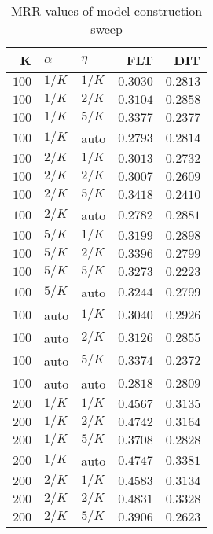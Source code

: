 
\begin{table}
\begin{spacing}{1.2}
\centering
\caption{MRR values of \tika model construction sweep}
\label{table:tika_model_sweep}
\vspace{0.2em}
\parbox{.45\linewidth}{\centering \begin{tabular}{rll|rr}
\toprule
    K &  $\alpha$ &    $\eta$ &           FLT &      DIT \\
\midrule
$100$ &  $1/K$ &  $1/K$ &      $0.3030$ & $0.2813$ \\
$100$ &  $1/K$ &  $2/K$ &      $0.3104$ & $0.2858$ \\
$100$ &  $1/K$ &  $5/K$ &      $0.3377$ & $0.2377$ \\
$100$ &  $1/K$ &   auto &      $0.2793$ & $0.2814$ \\
$100$ &  $2/K$ &  $1/K$ &      $0.3013$ & $0.2732$ \\
$100$ &  $2/K$ &  $2/K$ &      $0.3007$ & $0.2609$ \\
$100$ &  $2/K$ &  $5/K$ &      $0.3418$ & $0.2410$ \\
$100$ &  $2/K$ &   auto &      $0.2782$ & $0.2881$ \\
$100$ &  $5/K$ &  $1/K$ &      $0.3199$ & $0.2898$ \\
$100$ &  $5/K$ &  $2/K$ &      $0.3396$ & $0.2799$ \\
$100$ &  $5/K$ &  $5/K$ &      $0.3273$ & $0.2223$ \\
$100$ &  $5/K$ &   auto &      $0.3244$ & $0.2799$ \\
$100$ &   auto &  $1/K$ &      $0.3040$ & $0.2926$ \\
$100$ &   auto &  $2/K$ &      $0.3126$ & $0.2855$ \\
$100$ &   auto &  $5/K$ &      $0.3374$ & $0.2372$ \\
$100$ &   auto &   auto &      $0.2818$ & $0.2809$ \\
$200$ &  $1/K$ &  $1/K$ &      $0.4567$ & $0.3135$ \\
$200$ &  $1/K$ &  $2/K$ &      $0.4742$ & $0.3164$ \\
$200$ &  $1/K$ &  $5/K$ &      $0.3708$ & $0.2828$ \\
$200$ &  $1/K$ &   auto &      $0.4747$ & $0.3381$ \\
$200$ &  $2/K$ &  $1/K$ &      $0.4583$ & $0.3134$ \\
$200$ &  $2/K$ &  $2/K$ & $\bm{0.4831}$ & $0.3328$ \\
$200$ &  $2/K$ &  $5/K$ &      $0.3906$ & $0.2623$ \\

\end{tabular}}
\end{spacing}
\end{table}
